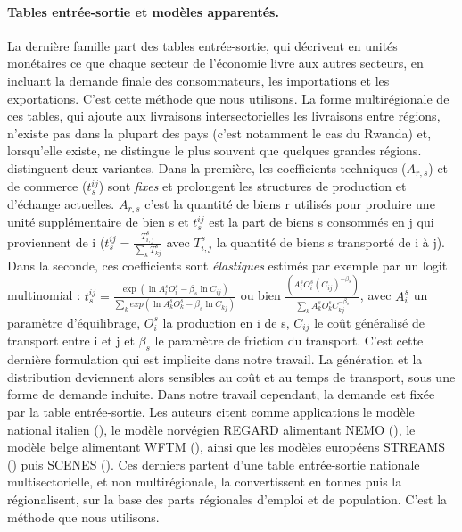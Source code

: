 \documentclass[12pt,a4paper,french]{report}
\begin{document}
	\paragraph{Tables entrée-sortie et modèles apparentés.} La dernière famille part des tables entrée-sortie, qui décrivent en unités monétaires ce que chaque secteur de l'économie livre aux autres secteurs, en incluant la demande finale des consommateurs, les importations et les exportations. C'est cette méthode que nous utilisons. La forme multirégionale de ces tables, qui ajoute aux livraisons intersectorielles les livraisons entre régions, n'existe pas dans la plupart des pays (c'est notamment le cas du Rwanda) et, lorsqu'elle existe, ne distingue le plus souvent que quelques grandes régions. \cite{deJong2004} distinguent deux variantes. Dans la première, les coefficients techniques ($A_{r,s}$) et de commerce ($t_s^{ij}$) sont \emph{fixes} et prolongent les structures de production et d'échange actuelles. $A_{r,s}$ c'est la quantité de biens r utilisés pour produire une unité supplémentaire de bien s et $t_s^{ij}$ est la part de biens s consommés en j qui proviennent de i ($t_s^{ij} = \frac{T_{i,j}^s}{\sum_k T_{kj}^s}$ avec $T_{i,j}^s$ la quantité de biens s transporté de i à j). Dans la seconde, ces coefficients sont \emph{élastiques} estimés par exemple par un logit multinomial : $t_s^{ij} = \frac{\exp{(\ln{A_i^s O_i^s}-\beta_s \ln {C_{ij}})}}{\sum_k exp{(\ln{A_k^s O_k^s}-\beta_s \ln{C_{kj}})}}$ ou bien $\frac{(A_i^s O_i^s (C_{ij})^{-\beta_s})}{\sum_k A_k^s O_k^s C_{kj}^{-\beta_s}}$, avec $A_i^s$ un paramètre d'équilibrage, $O_i^s$ la production en i de s, $C_{ij}$ le coût généralisé de transport entre i et j et $\beta_s$ le paramètre de friction du transport. C'est cette dernière formulation qui est implicite dans notre travail. La génération et la distribution deviennent alors sensibles au coût et au temps de transport, sous une forme de demande induite. Dans notre travail cependant, la demande est fixée par la table entrée-sortie. Les auteurs citent comme applications le modèle national italien (\cite{Cascetta1997}), le modèle norvégien REGARD alimentant NEMO (\cite{Expedite2000}), le modèle belge alimentant WFTM (\cite{GeertsJourquin2000}), ainsi que les modèles européens STREAMS (\cite{Leitham1999}) puis SCENES (\cite{Scenes2001}). Ces derniers partent d'une table entrée-sortie nationale multisectorielle, et non multirégionale, la convertissent en tonnes puis la régionalisent,  sur la base des parts régionales d'emploi et de population. C'est la méthode que nous utilisons.
\end{document}
